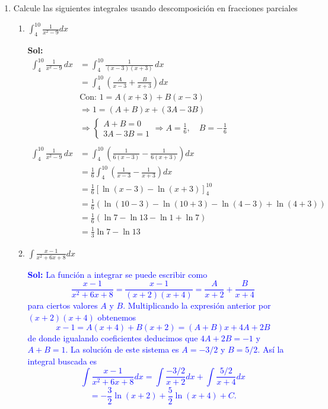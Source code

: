 \documentclass[letterpaper,12pt]{article}
\theoremstyle{plain}
\theoremstyle{definition}
\begin{document}
\begin{enumerate}
\item Calcule las siguientes integrales usando descomposición en fracciones parciales
\begin{enumerate}
\item $\displaystyle \int_{4}^{10} \frac{1}{x^2 - 9}dx$

\color{blue}
\textbf{Sol:} \begin{align*}
\int_{4}^{10} \frac{1}{x^2 - 9} \, dx 
&= \int_{4}^{10} \frac{1}{(x - 3)(x + 3)} \, dx \\
&= \int_{4}^{10} \left( \frac{A}{x - 3} + \frac{B}{x + 3} \right) dx \\
&\text{Con: } 1 = A(x + 3) + B(x - 3) \\
&\Rightarrow 1 = (A + B)x + (3A - 3B) \\
&\Rightarrow 
\begin{cases}
A + B = 0 \\
3A - 3B = 1
\end{cases}
\Rightarrow A = \frac{1}{6}, \quad B = -\frac{1}{6} \\
\\
\int_{4}^{10} \frac{1}{x^2 - 9} \, dx 
&= \int_{4}^{10} \left( \frac{1}{6(x - 3)} - \frac{1}{6(x + 3)} \right) dx \\
&= \frac{1}{6} \int_{4}^{10} \left( \frac{1}{x - 3} - \frac{1}{x + 3} \right) dx \\
&= \frac{1}{6} \left[ \ln(x - 3) - \ln(x + 3) \right]_{4}^{10} \\
&= \frac{1}{6} \left( \ln(10 - 3) - \ln(10 + 3) - \ln(4 - 3) + \ln(4 + 3) \right) \\
&= \frac{1}{6} \left( \ln 7 - \ln 13 - \ln 1 + \ln 7 \right) \\
&= \frac{1}{3} \ln 7 - \ln 13
\end{align*}
\color{black}
\item $\displaystyle \int \frac{x - 1}{x^2 + 6x + 8} dx$ 

\textcolor{blue}{
\textbf{Sol:} La función a integrar se puede escribir como
\[
\frac{x - 1}{x^2 + 6x + 8} = \frac{x - 1}{(x + 2)(x + 4)} = \frac{A}{x + 2} + \frac{B}{x + 4}
\]
para ciertos valores \( A \) y \( B \). Multiplicando la expresión anterior por \( (x + 2)(x + 4) \) obtenemos
\[
x - 1 = A(x + 4) + B(x + 2) = (A + B)x + 4A + 2B
\]
de donde igualando coeficientes deducimos que \( 4A + 2B = -1 \) y \( A + B = 1 \). La solución de este sistema es \( A = -3/2 \) y \( B = 5/2 \). Así la integral buscada es
\[
\int \frac{x - 1}{x^2 + 6x + 8}dx = \int \frac{-3/2}{x + 2}dx + \int \frac{5/2}{x + 4}dx
\]
\[
= -\frac{3}{2} \ln(x + 2) + \frac{5}{2} \ln(x + 4) + C.
\]
}


\end{enumerate}
\end{enumerate}
\end{document}
